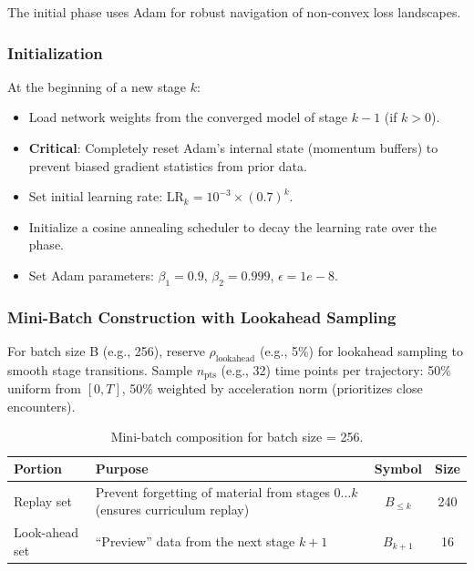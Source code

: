 \documentclass{article}
\begin{document}
The initial phase uses Adam for robust navigation of non-convex loss landscapes.

\subsubsection{Initialization}
At the beginning of a new stage $k$:
\begin{itemize}
    \item Load network weights from the converged model of stage $k-1$ (if $k > 0$).
    \item \textbf{Critical}: Completely reset Adam's internal state (momentum buffers) to prevent biased gradient statistics from prior data.
    \item Set initial learning rate: $\text{LR}_k = 10^{-3} \times (0.7)^k$.
    \item Initialize a cosine annealing scheduler to decay the learning rate over the phase.
    \item Set Adam parameters: $\beta_1 = 0.9$, $\beta_2 = 0.999$, $\epsilon=1e-8$.
\end{itemize}

\subsubsection{Mini-Batch Construction with Lookahead Sampling}

For batch size B (e.g., 256), reserve $\rho_{\text{lookahead}}$ (e.g., 5\%) for lookahead sampling to smooth stage transitions. 
Sample $n_{\text{pts}}$ (e.g., 32) time points per trajectory: 50\% uniform from $[0, T]$, 50\% weighted by acceleration norm 
(prioritizes close encounters).


\begin{table}[H]
    \centering
    \begin{tabular}{|p{2.5cm}|p{4.5cm}|c|c|}
    \hline
    \textbf{Portion} & \textbf{Purpose} & \textbf{Symbol} & \textbf{Size} \\
    \hline
    Replay set & Prevent forgetting of material from stages $0 \ldots k$ (ensures curriculum replay) & $B_{\leq k}$ & 240 \\
    Look-ahead set & ``Preview'' data from the next stage $k+1$ & $B_{k+1}$ & 16 \\
    \hline
    \end{tabular}
    \caption{Mini-batch composition for batch size = 256.}
\end{table}
\end{document}
